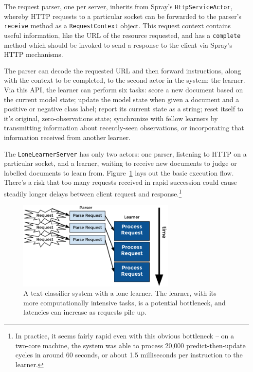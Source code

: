 \documentclass[tablecaption=bottom,wcp]{jmlr}
\begin{document}
The request parser, one per server, inherits from Spray's \texttt{HttpServiceActor},
whereby HTTP requests to a particular socket can be forwarded to the parser's
\texttt{receive} method as a \texttt{RequestContext} object. This request context
contains useful information, like the URL of the resource requested, and has a
\texttt{complete} method which should be invoked to send a response to the
client via Spray's HTTP mechanisms.

The parser can decode the requested URL and then forward instructions, along with
the context to be completed, to the second actor in the system: the learner. Via this 
API, the learner can perform six tasks: score a new document based on the current 
model state; update the model state when given a document and a positive or negative 
class label; report its current state as a string; reset itself to it's original, 
zero-observations state; synchronize with fellow learners by transmitting information
about recently-seen observations, or incorporating that information received from another
learner.

The \texttt{LoneLearnerServer} has only two actors: one parser, listening to HTTP on
a particular socket, and a learner, waiting to receive new documents to judge or labelled
documents to learn from. Figure~\ref{fig_txt_cls_sng} lays out the basic execution flow.
There's a risk that too many requests received in rapid succession could cause steadily
longer delays between client request and response.\footnote{In practice, it seems
fairly rapid even with this obvious bottleneck -- on a two-core machine, the system was
able to process 20,000 predict-then-update cycles in around 60 seconds, or about 
1.5 milliseconds per instruction to the learner.}

\begin{figure}[h]
\includegraphics[width=0.7\textwidth]{fig/tex/single_txt_cls.png}
\centering
\caption{A text classifier system with a lone learner. The learner, with its more
computationally intensive tasks, is a potential bottleneck, and latencies can increase as
requests pile up.}
\label{fig_txt_cls_sng}
\end{figure}
\end{document}

